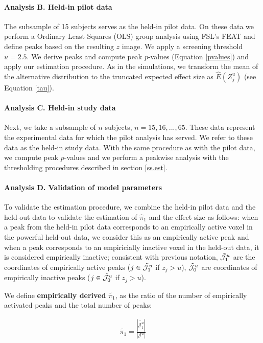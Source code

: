 \paragraph{Analysis B. Held-in pilot data}  The subsample of 15 subjects serves as the held-in pilot data.  On these data we perform a Ordinary Least Squares (OLS) group analysis using FSL's FEAT and define peaks based on the resulting $z$ image.  We apply a screening threshold $u=2.5$.  We derive peaks and compute peak $p$-values (Equation \ref{pvalues}) and apply our estimation procedure.  As in the simulations, we transform the mean of the alternative distribution to the truncated expected effect size as $\widehat{E}(Z_j^u)$ (see Equation \ref{tau}).

\paragraph{Analysis C. Held-in study data}  Next, we take a subsample of $n$ subjects, $n=15,16, ..., 65$. These data represent the experimental data for which the pilot analysis has served.  We refer to these data as the held-in study data.  With the same procedure as with the pilot data, we compute peak $p$-values and we perform a peakwise analysis with the thresholding procedures described in section \ref{ss.est}.

\paragraph{Analysis D. Validation of model parameters} To validate the estimation procedure, we combine the held-in pilot data and the held-out data to validate the estimation of $\hat\pi_1$ and the effect size as follows: when a peak from the held-in pilot data corresponds to an empirically active voxel in the powerful held-out data, we consider this as an empirically active peak and when a peak corresponds to an empiricially inactive voxel in the held-out data, it is considered empirically inactive;  consistent with previous notation, $\tilde {\cal J}_1^u$ are the coordinates of empirically active peaks ($j \in \tilde {\cal J}_1^u$ if $z_j>u$), $\tilde {\cal J}_0^u$ are coordinates of empirically inactive peaks ($j \in \tilde {\cal J}_0^u$ if $z_j>u$).

We define \textbf{empirically derived} $\widetilde{\pi_1}$, as the ratio of the number of empirically activated peaks and the total number of peaks:

\begin{align}
\widetilde{\pi_1} = \frac{|\tilde{\mathcal{J}_1^u}|}{|\mathcal{J}^u|}
\end{align}

